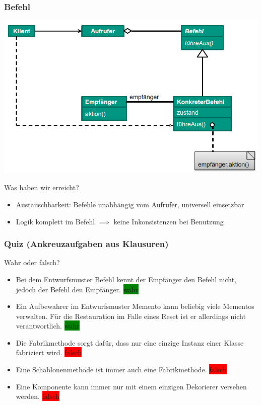 \documentclass[18pt]{beamer}
\begin{document}
	\begin{frame}
		\frametitle{Befehl}
		\includegraphics[scale=0.35]{./pics/tut4/command.png}
		\begin{block}{Was haben wir erreicht?}
			\begin{itemize}
				\item Austauschbarkeit: Befehle unabhängig vom Aufrufer, universell einsetzbar \pause
				\item Logik komplett im Befehl $\implies$ keine Inkonsistenzen bei Benutzung
			\end{itemize}
		\end{block}
	\end{frame}
	
	\begin{frame}
		\frametitle{Quiz (Ankreuzaufgaben aus Klausuren)}
		Wahr oder falsch?
		\begin{itemize}
			\item Bei dem Entwurfsmuster Befehl kennt der Empfänger den Befehl nicht, jedoch der Befehl den Empfänger. \pause \colorbox{green}{wahr} \pause
			\item Ein Aufbewahrer im Entwurfsmuster Memento kann beliebig viele Mementos verwalten. Für die Restauration im Falle eines Reset ist er allerdings nicht verantwortlich. \pause \colorbox{green}{wahr} \pause
			\item Die Fabrikmethode sorgt dafür, dass nur eine einzige Instanz einer Klasse fabriziert wird. \pause \colorbox{red}{falsch} \pause 
			\item Eine Schablonenmethode ist immer auch eine Fabrikmethode. \pause \colorbox{red}{falsch} \pause
			\item Eine Komponente kann immer nur mit einem einzigen Dekorierer versehen werden. \pause \colorbox{red}{falsch}
		\end{itemize}
	\end{frame}
	
\end{document}

